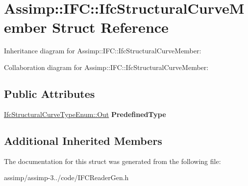 \hypertarget{struct_assimp_1_1_i_f_c_1_1_ifc_structural_curve_member}{\section{Assimp\+:\+:I\+F\+C\+:\+:Ifc\+Structural\+Curve\+Member Struct Reference}
\label{struct_assimp_1_1_i_f_c_1_1_ifc_structural_curve_member}
}


Inheritance diagram for Assimp\+:\+:I\+F\+C\+:\+:Ifc\+Structural\+Curve\+Member\+:


Collaboration diagram for Assimp\+:\+:I\+F\+C\+:\+:Ifc\+Structural\+Curve\+Member\+:
\subsection*{Public Attributes}
\begin{DoxyCompactItemize}
\item 
\hypertarget{struct_assimp_1_1_i_f_c_1_1_ifc_structural_curve_member_a671176e1cdf2a8f772726caa75ade764}{\hyperlink{classboost_1_1shared__ptr}{Ifc\+Structural\+Curve\+Type\+Enum\+::\+Out} {\bfseries Predefined\+Type}}\label{struct_assimp_1_1_i_f_c_1_1_ifc_structural_curve_member_a671176e1cdf2a8f772726caa75ade764}

\end{DoxyCompactItemize}
\subsection*{Additional Inherited Members}


The documentation for this struct was generated from the following file\+:\begin{DoxyCompactItemize}
\item 
assimp/assimp-\/3../code/I\+F\+C\+Reader\+Gen.\+h\end{DoxyCompactItemize}
